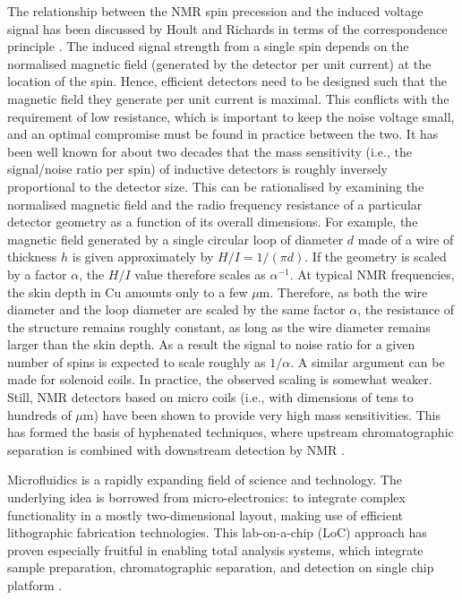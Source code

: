 The relationship 
between the NMR spin precession and the induced voltage signal has been discussed by Hoult and Richards 
in terms of the correspondence principle \cite{hoult1975cfd}. The  induced signal strength from a single spin depends on 
the normalised magnetic field (generated by the detector per unit current) at the location of the spin. 
Hence, efficient detectors need to be designed such that the magnetic field they generate per unit 
current is maximal. This conflicts with the requirement of low resistance, which is important to keep 
the noise voltage small, and an optimal compromise must be found in practice between the two.
It has been well known for about two decades that the mass sensitivity (i.e., the signal/noise ratio 
per spin) of inductive detectors is roughly inversely proportional to the detector size. This can be 
rationalised by examining the normalised magnetic field and the radio frequency resistance of a 
particular detector geometry as a function of its overall dimensions. For example, the magnetic field 
generated by a single circular loop of diameter $d$ made of a wire of thickness $h$ is given approximately 
by $H/I=1/(\pi d)$. If the geometry is scaled by a factor $\alpha$, the $H/I$ value therefore scales as 
$\alpha^{-1}$. At typical NMR frequencies, the skin depth in Cu amounts only to a few $\mu$m. Therefore, 
as both the wire diameter and the loop diameter are scaled by the same factor $\alpha$, the 
resistance of the structure remains roughly constant, as long as the wire diameter remains larger than 
the skin depth. As a result the signal to noise ratio for a given number of spins is expected to scale roughly as $1/\alpha$. A 
similar argument can be made for solenoid coils. 
In practice, the observed scaling is somewhat weaker. Still, 
NMR detectors based on micro coils (i.e., with dimensions of tens to hundreds of $\mu$m) have been shown 
to provide very high mass sensitivities. This has formed the basis of hyphenated techniques, where 
upstream chromatographic separation is combined with downstream detection by NMR  \cite{webb2005nmr}.

Microfluidics is a rapidly expanding field of science and technology. The underlying idea is borrowed 
from micro-electronics: to integrate complex functionality in a mostly two-dimensional layout, making 
use of efficient lithographic fabrication technologies. This lab-on-a-chip (LoC) approach has proven 
especially fruitful in enabling total analysis systems, which integrate sample preparation, 
chromatographic separation, and detection on single chip platform \cite{Manz:1990vc}.

